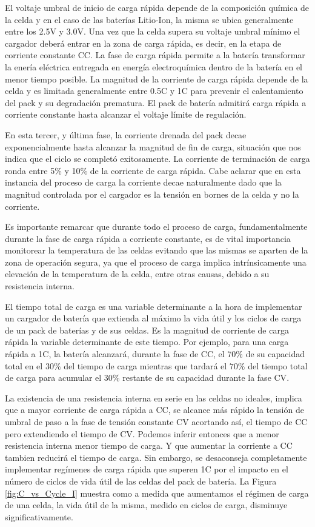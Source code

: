 El voltaje umbral de inicio de carga rápida depende de la composici\'on
qu\'imica de la celda y en el caso de las baterías Litio-Ion, la misma 
se ubica generalmente entre los 2.5V y 3.0V. Una vez que la celda supera su 
voltaje umbral mínimo el cargador deber\'a entrar en la zona de carga rápida, es
decir, en la etapa de corriente constante \acrshort{CC}. La fase de carga rápida 
permite a la batería transformar la enería eléctrica entregada en energía 
electroquímica dentro de la batería en el menor tiempo posible. La magnitud de 
la corriente de carga rápida depende de la celda y es limitada generalmente 
entre 0.5C y 1C para prevenir el calentamiento del pack y su degradación 
prematura. El pack de batería admitirá carga rápida a corriente constante hasta 
alcanzar el voltaje límite de regulación. 

En esta tercer, y última fase, la corriente drenada del pack decae
exponencialmente hasta alcanzar la magnitud de fin de carga, situación que nos
indica que el ciclo se complet\'o exitosamente. La corriente de terminación de
carga ronda entre 5\% y 10\% de la corriente de carga rápida. Cabe aclarar
que en esta instancia del proceso de carga la corriente decae naturalmente dado
que la magnitud controlada por el cargador es la tensi\'on en bornes de la
celda y no la corriente.  

Es importante remarcar que durante todo el proceso de carga, fundamentalmente 
durante la fase de carga rápida a corriente constante, es de vital importancia 
monitorear la temperatura de las celdas evitando que las mismas se aparten de la 
zona de operación segura, ya que el proceso de carga implica intrínsicamente una 
elevación de la temperatura de la celda, entre otras causas, debido a su 
resistencia interna.

El tiempo total de carga es una variable determinante a la hora de implementar
un cargador de batería que extienda al máximo la vida útil y los ciclos de carga
de un pack de baterías y de sus celdas. Es la magnitud de corriente de carga
rápida la variable determinante de este tiempo. Por ejemplo, para una
carga rápida a 1C, la batería alcanzará, durante la fase de \acrshort{CC}, el
$70\%$ de su capacidad total en el $30\%$ del tiempo de carga mientras que
tardará el $70\%$ del tiempo total de carga para acumular el $30\%$ restante de
su capacidad durante la fase \acrshort{CV}. 

La existencia de una resistencia interna en serie en las celdas no ideales,
implica que a mayor corriente de carga rápida a CC, se alcance más rápido la
tensión de umbral de paso a la fase de tensión constante CV acortando as\'i, el 
tiempo de CC pero extendiendo el tiempo de CV. Podemos inferir entonces que a 
menor resistencia interna menor tiempo de carga. Y que aumentar la corriente a CC
tambien reducirá el tiempo de carga.  Sin embargo, se desaconseja completamente
implementar regímenes de carga rápida que superen 1C por el impacto en el número
de ciclos de vida útil de las celdas del pack de batería. La Figura
\ref{fig:C_vs_Cycle_I} muestra como a medida que aumentamos el régimen de carga
de una celda, la vida \'util de la misma, medido en ciclos de carga, disminuye
significativamente.

